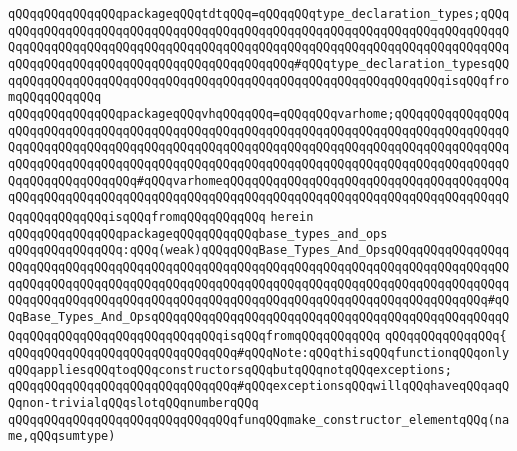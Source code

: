 \verb|qQQqqQQqqQQqqQQqpackageqQQqtdtqQQq=qQQqqQQqtype_declaration_types;qQQqqQQqqQQqqQQqqQQqqQQqqQQqqQQqqQQqqQQqqQQqqQQqqQQqqQQqqQQqqQQqqQQqqQQqqQQqqQQqqQQqqQQqqQQqqQQqqQQqqQQqqQQqqQQqqQQqqQQqqQQqqQQqqQQqqQQqqQQqqQQqqQQqqQQqqQQqqQQqqQQqqQQqqQQqqQQqqQQqqQQq#qQQqtype_declaration_typesqQQqqQQqqQQqqQQqqQQqqQQqqQQqqQQqqQQqqQQqqQQqqQQqqQQqqQQqqQQqqQQqisqQQqfromqQQqqQQqqQQq|\newline
\verb|qQQqqQQqqQQqqQQqpackageqQQqvhqQQqqQQq=qQQqqQQqvarhome;qQQqqQQqqQQqqQQqqQQqqQQqqQQqqQQqqQQqqQQqqQQqqQQqqQQqqQQqqQQqqQQqqQQqqQQqqQQqqQQqqQQqqQQqqQQqqQQqqQQqqQQqqQQqqQQqqQQqqQQqqQQqqQQqqQQqqQQqqQQqqQQqqQQqqQQqqQQqqQQqqQQqqQQqqQQqqQQqqQQqqQQqqQQqqQQqqQQqqQQqqQQqqQQqqQQqqQQqqQQqqQQqqQQqqQQqqQQqqQQqqQQq#qQQqvarhomeqQQqqQQqqQQqqQQqqQQqqQQqqQQqqQQqqQQqqQQqqQQqqQQqqQQqqQQqqQQqqQQqqQQqqQQqqQQqqQQqqQQqqQQqqQQqqQQqqQQqqQQqqQQqqQQqqQQqqQQqqQQqisqQQqfromqQQqqQQqqQQq|\newline
\verb|herein|\newline
\newline
\verb|qQQqqQQqqQQqqQQqpackageqQQqqQQqqQQqbase_types_and_ops|\newline
\verb|qQQqqQQqqQQqqQQq:qQQq(weak)qQQqqQQqBase_Types_And_OpsqQQqqQQqqQQqqQQqqQQqqQQqqQQqqQQqqQQqqQQqqQQqqQQqqQQqqQQqqQQqqQQqqQQqqQQqqQQqqQQqqQQqqQQqqQQqqQQqqQQqqQQqqQQqqQQqqQQqqQQqqQQqqQQqqQQqqQQqqQQqqQQqqQQqqQQqqQQqqQQqqQQqqQQqqQQqqQQqqQQqqQQqqQQqqQQqqQQqqQQqqQQqqQQqqQQqqQQqqQQqqQQq#qQQqBase_Types_And_OpsqQQqqQQqqQQqqQQqqQQqqQQqqQQqqQQqqQQqqQQqqQQqqQQqqQQqqQQqqQQqqQQqqQQqqQQqqQQqqQQqisqQQqfromqQQqqQQqqQQq|\newline
\verb|qQQqqQQqqQQqqQQq{|\newline
\newline
\verb|qQQqqQQqqQQqqQQqqQQqqQQqqQQqqQQq#qQQqNote:qQQqthisqQQqfunctionqQQqonlyqQQqappliesqQQqtoqQQqconstructorsqQQqbutqQQqnotqQQqexceptions;|\newline
\verb|qQQqqQQqqQQqqQQqqQQqqQQqqQQqqQQq#qQQqexceptionsqQQqwillqQQqhaveqQQqaqQQqnon-trivialqQQqslotqQQqnumberqQQq|\newline
\newline
\verb|qQQqqQQqqQQqqQQqqQQqqQQqqQQqqQQqfunqQQqmake_constructor_elementqQQq(name,qQQqsumtype)|\newline

